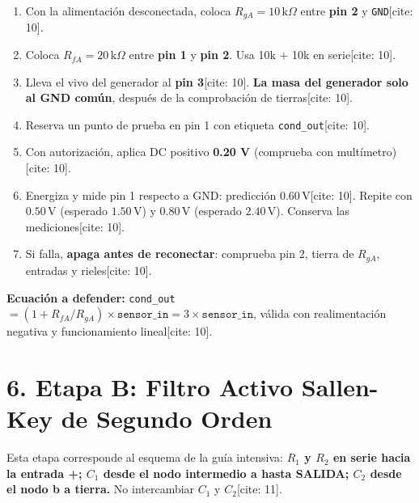 \documentclass[11pt, a4paper]{article}
\begin{document}
\begin{enumerate}[noitemsep, leftmargin=*]
    \item Con la alimentación desconectada, coloca $R_{gA} = 10\,\text{k}\Omega$ entre \textbf{pin 2} y \texttt{GND}[cite: 10].
    \item Coloca $R_{fA} = 20\,\text{k}\Omega$ entre \textbf{pin 1} y \textbf{pin 2}. Usa 10k + 10k en serie[cite: 10].
    \item Lleva el vivo del generador al \textbf{pin 3}[cite: 10]. \textbf{La masa del generador solo al GND común}, después de la comprobación de tierras[cite: 10].
    \item Reserva un punto de prueba en pin 1 con etiqueta \texttt{cond\_out}[cite: 10].
    \item Con autorización, aplica DC positivo \textbf{0.20 V} (comprueba con multímetro)[cite: 10].
    \item Energiza y mide pin 1 respecto a GND: predicción $0.60\,\text{V}$[cite: 10]. Repite con $0.50\,\text{V}$ (esperado $1.50\,\text{V}$) y $0.80\,\text{V}$ (esperado $2.40\,\text{V}$). Conserva las mediciones[cite: 10].
    \item Si falla, \textbf{apaga antes de reconectar}: comprueba pin 2, tierra de $R_{gA}$, entradas y rieles[cite: 10].
\end{enumerate}

\textbf{Ecuación a defender:} \texttt{cond\_out} $= (1 + R_{fA}/R_{gA}) \times \texttt{sensor\_in} = 3 \times \texttt{sensor\_in}$, válida con realimentación negativa y funcionamiento lineal[cite: 10].

\newpage
\section{6. Etapa B: Filtro Activo Sallen-Key de Segundo Orden}

Esta etapa corresponde al esquema de la guía intensiva: \textbf{$R_1$ y $R_2$ en serie hacia la entrada +; $C_1$ desde el nodo intermedio a hasta SALIDA; $C_2$ desde el nodo b a tierra.} No intercambiar $C_1$ y $C_2$[cite: 11].
\end{document}
